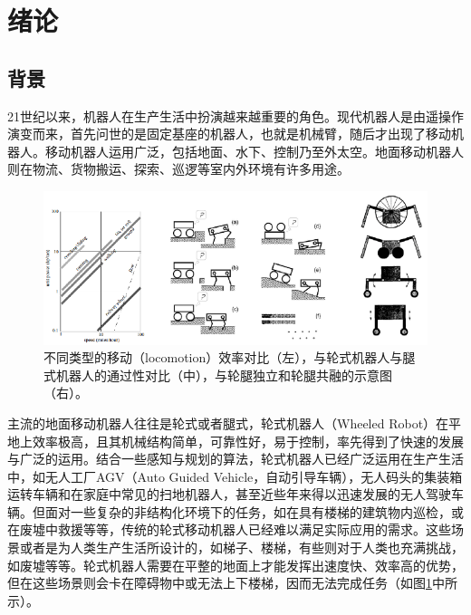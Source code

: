 \section{绪论}



\subsection{背景}
21世纪以来，机器人在生产生活中扮演越来越重要的角色。现代机器人是由遥操作演变而来，首先问世的是固定基座的机器人，也就是机械臂，随后才出现了移动机器人\cite{corke2011robotics}。移动机器人运用广泛，包括地面、水下、控制乃至外太空\cite{Siciliano2016handbook}。地面移动机器人则在物流、货物搬运、探索、巡逻等室内外环境有许多用途。

\begin{figure}[h!]
  \centering
  \includegraphics[width=1.0\linewidth]{figures/Sec1/wl.png}
  \caption{
  不同类型的移动（locomotion）效率对比\cite{siegwart2011introduction}（左），与轮式机器人与腿式机器人的通过性对比\cite{siegwart2011introduction}（中），与轮腿独立和轮腿共融的示意图\cite{eiji1993leg}（右）。
  }
  \label{fig:sec1-wl}
   \vspace{6pt}
\end{figure}

主流的地面移动机器人往往是轮式或者腿式，轮式机器人（Wheeled Robot）在平地上效率极高，且其机械结构简单，可靠性好，易于控制，率先得到了快速的发展与广泛的运用。结合一些感知与规划的算法，轮式机器人已经广泛运用在生产生活中，如无人工厂AGV\cite{Siciliano2016handbook}\cite{khatib2016springer}（Auto Guided Vehicle，自动引导车辆），无人码头的集装箱运转车辆\cite{Qingdaoport}和在家庭中常见的扫地机器人，甚至近些年来得以迅速发展的无人驾驶车辆。但面对一些复杂的非结构化环境下的任务，如在具有楼梯的建筑物内巡检，或在废墟中救援等等，传统的轮式移动机器人已经难以满足实际应用的需求。这些场景或者是为人类生产生活所设计的，如梯子、楼梯，有些则对于人类也充满挑战，如废墟等等。轮式机器人需要在平整的地面上才能发挥出速度快、效率高的优势，但在这些场景则会卡在障碍物中或无法上下楼梯，因而无法完成任务（如图\ref{fig:sec1-wl}中所示）。

